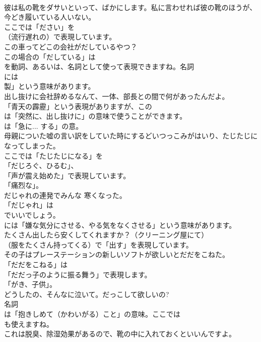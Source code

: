 \documentclass[8pt]{extreport}
\begin{document}
\begin{CJK}{UTF8}{min}
\\	彼は私の靴をダサいといって、ばかにします。私に言わせれば彼の靴のほうが、今どき履いている人いない。 
\\	ここでは「ださい」を 
\\	（流行遅れの）で表現しています。	
\\	この車ってどこの会社がだしているやつ？ 
\\	この場合の「だしている」は
\\	を動詞、あるいは、名詞として使って表現できますね。名詞
\\	には
\\	製」という意味があります。	
\\	出し抜けに会社辞めるなんて、一体、部長との間で何があったんだよ。 
\\	「青天の霹靂」という表現がありますが、この
\\	は「突然に、出し抜けに」の意味で使うことができます。
\\	は「急に... する」の意。	
\\	母親についた嘘の言い訳をしていた時にするどいつっこみがはいり、たじたじになってしまった。 
\\	ここでは「たじたじになる」を
\\	「だじろぐ、ひるむ」、
\\	「声が震え始めた」で表現しています。
\\	「痛烈な」。	
\\	だじゃれの連発でみんな 寒くなった。 
\\	「だじゃれ」は
\\	でいいでしょう。
\\	には「嫌な気分にさせる、やる気をなくさせる」という意味があります。	
\\	たくさん出したら安くしてくれますか？（クリーニング屋にて） 
\\	（服をたくさん持ってくる）で「出す」を表現しています。	
\\	その子はプレーステーションの新しいソフトが欲しいとだだをこねた。 
\\	「だだをこねる」は
\\	「だだっ子のように振る舞う」で表現します。
\\	「がき、子供」。	
\\	どうしたの、そんなに泣いて。だっこして欲しいの? 
\\	名詞
\\	は「抱きしめて（かわいがる）こと」の意味。ここでは
\\	も使えますね。	
\\	これは脱臭、除湿効果があるので、靴の中に入れておくといいんですよ。 

\end{CJK}
\end{document}
